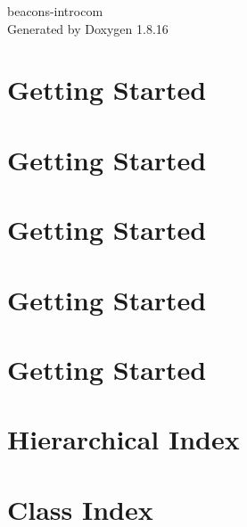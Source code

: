 \let\mypdfximage\pdfximage\def\pdfximage{\immediate\mypdfximage}\documentclass[twoside]{book}
\newcommand{\+}{\discretionary{\mbox{\scriptsize$\hookleftarrow$}}{}{}}
\newcommand{\clearemptydoublepage}{%
  \newpage{\pagestyle{empty}\cleardoublepage}%
}
\begin{document}
\hypersetup{pageanchor=false,
             bookmarksnumbered=true,
             pdfencoding=unicode
            }
\begin{titlepage}
\vspace*{7cm}
\begin{center}%
{\Large beacons-\/introcom }\\
\vspace*{1cm}
{\large Generated by Doxygen 1.8.16}\\
\end{center}
\end{titlepage}
\clearemptydoublepage
{}
\tableofcontents
\clearemptydoublepage
{}
\hypersetup{pageanchor=true}

\chapter{Getting Started}
\label{md_beacon-service__h_e_l_p}

\chapter{Getting Started}
\label{md_discovery-service__h_e_l_p}

\chapter{Getting Started}
\label{md__h_e_l_p}

\chapter{Getting Started}
\label{md_poi-service__h_e_l_p}

\chapter{Getting Started}
\label{md_proxy-service__h_e_l_p}

\chapter{Hierarchical Index}

\chapter{Class Index}

\end{document}
